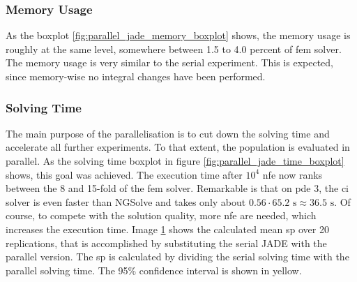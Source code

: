 \documentclass[./\jobname.tex]{subfiles}
\begin{document}
\subsubsection{Memory Usage}
As the boxplot \ref{fig:parallel_jade_memory_boxplot} shows, the memory usage is roughly at the same level, somewhere between 1.5 to 4.0 percent of \gls{fem} solver. The memory usage is very similar to the serial experiment. This is expected, since memory-wise no integral changes have been performed.  
\subsubsection{Solving Time}
The main purpose of the parallelisation is to cut down the solving time and accelerate all further experiments. To that extent, the population is evaluated in parallel. As the solving time boxplot in figure \ref{fig:parallel_jade_time_boxplot} shows, this goal was achieved. The execution time after $10^4$ \gls{nfe} now ranks between the 8 and 15-fold of the \gls{fem} solver. Remarkable is that on \gls{pde} 3, the \gls{ci} solver is even faster than NGSolve and takes only about $0.56 \cdot 65.2 \text{ s} \approx 36.5 \text{ s}$. Of course, to compete with the solution quality, more \gls{nfe} are needed, which increases the execution time. Image \ref{fig:serial_to_parallel_speedup} shows the calculated mean \gls{sp} over 20 replications, that is accomplished by substituting the serial JADE with the parallel version. The \gls{sp} is calculated by dividing the serial solving time with the parallel solving time. The 95\% confidence interval is shown in yellow. 
\begin{figure}[h]
	\centering
	\noindent{}
	\label{fig:serial_to_parallel_speedup}
\end{figure}
\end{document}
